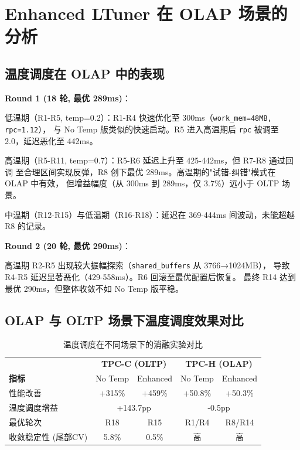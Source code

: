 
\section{Enhanced LTuner 在 OLAP 场景的分析}

\subsection{温度调度在 OLAP 中的表现}

\textbf{Round 1 (18 轮, 最优 289ms)}：

低温期（R1-R5, temp=0.2）：R1-R4 快速优化至 300ms（\texttt{work\_mem=48MB, rpc=1.12}），
与 No Temp 版类似的快速启动。R5 进入高温期后 \texttt{rpc} 被调至 2.0，延迟恶化至 442ms。

高温期（R5-R11, temp=0.7）：R5-R6 延迟上升至 425-442ms，但 R7-R8 通过回调
至合理区间实现反弹，R8 创下最优 289ms。高温期的"试错-纠错"模式在 OLAP 中有效，
但增益幅度（从 300ms 到 289ms，仅 3.7\%）远小于 OLTP 场景。

中温期（R12-R15）与低温期（R16-R18）：延迟在 369-444ms 间波动，未能超越 R8 的记录。

\textbf{Round 2 (20 轮, 最优 290ms)}：

高温期 R2-R5 出现较大振幅探索（\texttt{shared\_buffers} 从 3766→1024MB），
导致 R4-R5 延迟显著恶化（429-558ms）。R6 回滚至最优配置后恢复。
最终 R14 达到最优 290ms，但整体收敛不如 No Temp 版平稳。

\subsection{OLAP 与 OLTP 场景下温度调度效果对比}

\begin{table}[h]
\centering
\caption{温度调度在不同场景下的消融实验对比}
\label{tab:ablation-cross}
\begin{tabular}{l|cc|cc}
\hline
 & \multicolumn{2}{c|}{\textbf{TPC-C (OLTP)}} & \multicolumn{2}{c}{\textbf{TPC-H (OLAP)}} \\
\textbf{指标} & No Temp & Enhanced & No Temp & Enhanced \\
\hline
性能改善              & +315\%    & +459\%    & +50.8\%   & +50.3\%   \\
温度调度增益          & \multicolumn{2}{c|}{+143.7pp} & \multicolumn{2}{c}{-0.5pp} \\
最优轮次              & R18       & R15       & R1/R4     & R8/R14    \\
收敛稳定性 (尾部CV)   & 5.8\%     & 0.5\%     & 高        & 高        \\
\hline
\end{tabular}
\end{table}

